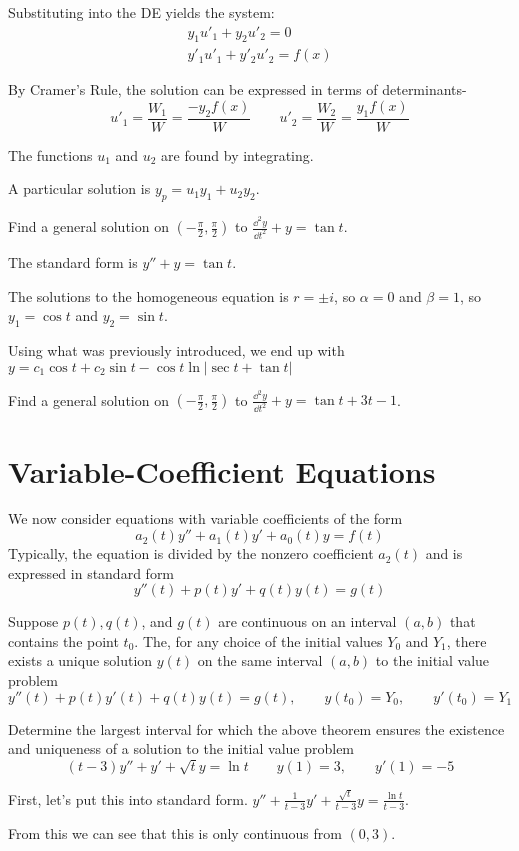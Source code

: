 \documentclass[../diffeq.tex]{subfiles}
\begin{document}
Substituting into the DE yields the system:
\begin{align*}
y_1u'_1+y_2u'_2=0 \\
y'_1u'_1+y'_2u'_2 = f(x)
\end{align*}

By Cramer's Rule, the solution can be expressed in terms of determinants- 
\[ u'_1=\frac{W_1}{W}=\frac{-y_2f(x)}{W} \qquad u'_2=\frac{W_2}{W}=\frac{y_1f(x)}{W} \]

The functions $u_1$ and $u_2$ are found by integrating.

A particular solution is $y_p=u_1y_1+u_2y_2$.

\begin{example}
    Find a general solution on $(-\frac{\pi}{2},\frac{\pi}{2})$ to $\frac{\dd^2 y}{\dd t^2}+y=\tan t$.

    The standard form is $y''+y=\tan t$.

    The solutions to the homogeneous equation is $r=\pm i$, so $\alpha = 0$ and $\beta = 1$, so $y_1=\cos t$ and $y_2=\sin t$.

    Using what was previously introduced, we end up with $y=c_1\cos t + c_2\sin t - \cos t \ln|\sec t+\tan t|$
\end{example}

\ex Find a general solution on $(-\frac{\pi}{2},\frac{\pi}{2})$ to $\frac{\dd^2 y}{\dd t^2}+y=\tan t + 3t - 1$.

\section{Variable-Coefficient Equations}
We now consider equations with variable coefficients of the form 
\[ a_2(t)y''+a_1(t)y'+a_0(t)y=f(t) \]
Typically, the equation is divided by the nonzero coefficient $a_2(t)$ and is expressed in standard form 
\[ y''(t)+p(t)y'+q(t)y(t)=g(t) \]

\begin{theorem}
    Suppose $p(t), q(t)$, and $g(t)$ are continuous on an interval $(a,b)$ that contains the point $t_0$. The, for any choice of the initial values $Y_0$ and $Y_1$, there exists a 
    unique solution $y(t)$ on the same interval $(a,b)$ to the initial value problem 
    \[ y''(t)+p(t)y'(t)+q(t)y(t)=g(t), \qquad y(t_0)=Y_0, \qquad y'(t_0)=Y_1 \]
\end{theorem}

\pagebreak
\begin{example}
    Determine the largest interval for which the above theorem ensures the existence and uniqueness of a solution to the initial value problem 
    \[(t-3)y'' + y'+\sqrt{t}y = \ln t \qquad y(1)=3, \qquad y'(1)=-5 \]

    First, let's put this into standard form. $y''+\frac{1}{t-3}y' + \frac{\sqrt{t}}{t-3}y=\frac{\ln t}{t-3}$.

    From this we can see that this is only continuous from $(0,3)$.
\end{example}
\end{document}
